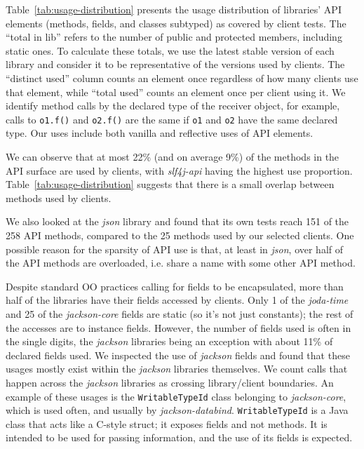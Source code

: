 Table~\ref{tab:usage-distribution} presents the usage distribution of
libraries' API elements (methods, fields, and classes subtyped) as
covered by client tests. The ``total in lib'' refers to the number of
public and protected members, including static ones. To calculate these totals,
we use the latest stable version of each library and consider it to be representative of 
the versions used by clients.  The ``distinct used'' column counts an
element once regardless of how many clients use that element, while
``total used'' counts an element once per client using it. We identify method calls by the
declared type of the receiver object, for example, calls to {\tt o1.f()} and {\tt o2.f()} are the same
if {\tt o1} and {\tt o2} have the same declared type.
Our uses 
include both vanilla and reflective uses of API elements.

%

We can observe that at most 22\% (and on average 9\%) of the methods in the API surface
are used by clients, with \emph{slf4j-api} having the highest use proportion.
Table~\ref{tab:usage-distribution} suggests that there is a small overlap between methods
used by clients.

We also looked at the \emph{json} library and found that its own tests reach 151
of the 258 API methods, compared to the 25 methods used by our selected
clients. One possible reason for the sparsity of API use is that, at least in \emph{json}, over half of the API methods are overloaded, i.e. share a name with
some other API method.

Despite standard OO practices calling for fields to be encapsulated, more than half of the libraries have their fields accessed by clients. Only 1 of the \emph{joda-time} and 25 of the \emph{jackson-core} fields are static (so it's not just constants); the rest of the accesses are to instance fields.
However, the number of fields used is often in the single digits,
the \emph{jackson} libraries being an exception with about 11\% of declared fields used.
We inspected the use of \emph{jackson} fields and found that these usages mostly exist within the \emph{jackson} libraries themselves.
We count calls that happen across the \emph{jackson} libraries as crossing library/client boundaries.
An example of these usages is the {\tt WritableTypeId} class belonging to \emph{jackson-core}, which is used often, and usually by \emph{jackson-databind}.
{\tt WritableTypeId} is a Java class that acts like a C-style struct; it exposes fields and not methods. It is intended to be used for passing information, and the use of its fields is expected.


